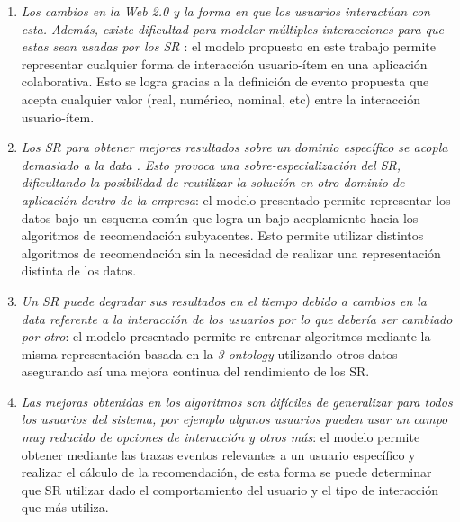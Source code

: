 \begin{enumerate}
	\item \textit{Los cambios en la Web 2.0 y la forma en que los usuarios interactúan con esta. Además, existe dificultad para modelar múltiples interacciones para que estas sean usadas por los SR \citep{Babar:2010}}: el modelo propuesto en este trabajo permite representar cualquier forma de interacción usuario-ítem en una aplicación colaborativa. Esto se logra gracias a la definición de evento propuesta que acepta cualquier valor (real, numérico, nominal, etc) entre la interacción usuario-ítem. 
	\item \textit{Los SR para obtener mejores resultados sobre un dominio específico se acopla demasiado a la data \citep{Babar:2010}. Esto provoca una sobre-especialización del SR, dificultando la posibilidad de reutilizar la solución en otro dominio de aplicación dentro de la empresa}: el modelo presentado permite representar los datos bajo un esquema común que logra un bajo acoplamiento hacia los algoritmos de recomendación subyacentes. Esto permite utilizar distintos algoritmos de recomendación sin la necesidad de realizar una representación distinta de los datos.
	\item \textit{Un SR puede degradar sus resultados en el tiempo debido a cambios en la data referente a la interacción  de los usuarios por lo que debería ser cambiado por otro}: el modelo presentado permite re-entrenar algoritmos mediante la misma representación basada en la \textit{3-ontology} utilizando otros datos asegurando así una mejora continua del rendimiento de los SR.
	\item \textit{Las mejoras obtenidas en los algoritmos son difíciles de generalizar para todos los usuarios del sistema,  por ejemplo algunos usuarios pueden usar un campo muy reducido de opciones de interacción y otros más}: el modelo permite obtener mediante las trazas eventos relevantes a un usuario específico y realizar el cálculo de la recomendación, de esta forma se puede determinar que SR utilizar dado el comportamiento del usuario y el tipo de interacción que más utiliza.
\end{enumerate}

%


